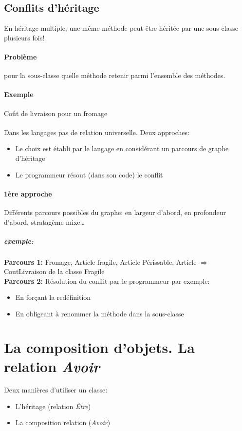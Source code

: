 \subsection{Conflits d'héritage}
En héritage multiple, une même méthode peut être héritée par une sous classe plusieurs fois!
\paragraph{Problème}pour la sous-classe quelle méthode retenir parmi l'ensemble des méthodes.
\paragraph{Exemple}Coût de livraison pour un fromage\\
\\
Dans les langages pas de relation universelle.
Deux approches:
\begin{itemize}
	\item Le choix est établi par le langage en considérant un parcours de graphe d'héritage
	\item Le programmeur résout (dans son code) le conflit
\end{itemize}
\paragraph{1ère approche}
Différents parcours possibles du graphe: en largeur d'abord, en profondeur d'abord, stratagème mixe\ldots
\subparagraph{exemple:}  
\textbf{Parcours 1:} Fromage, Article fragile, Article Périssable, Article 
$\Rightarrow$ CoutLivraison de la classe Fragile\\
\textbf{Parcours 2: } Résolution du conflit par le programmeur par exemple: 
\begin{itemize}
	\item En forçant la redéfinition
	\item En obligeant à renommer la méthode dans la sous-classe
\end{itemize}
\section{La composition d'objets. La relation \textit{Avoir}}
	Deux manières d'utiliser un classe: 
	\begin{itemize}
		\item L'héritage (relation \textit{Être})
		\item La composition relation (\textit{Avoir})
	\end{itemize}

